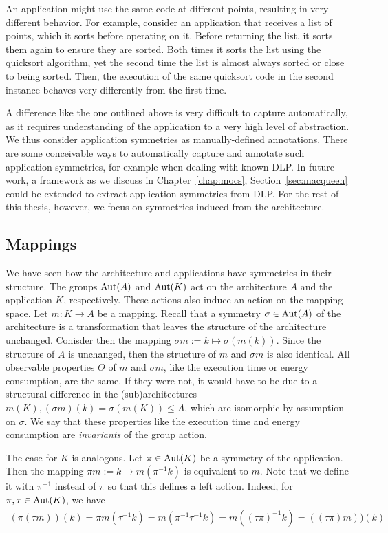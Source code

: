 An application might use the same code at different points, resulting in very different behavior.
For example, consider an application that receives a list of points, which it sorts before operating on it.
Before returning the list, it sorts them again to ensure they are sorted.
Both times it sorts the list using the quicksort algorithm, yet the second time the list is almost always sorted or close to being sorted.
Then, the execution of the same quicksort code in the second instance behaves very differently from the first time.

A difference like the one outlined above is very difficult to capture automatically, as it requires understanding of the application to a very high level of abstraction.
We thus consider application symmetries as manually-defined annotations.
There are some conceivable ways to automatically capture and annotate such application symmetries, for example when dealing with known \ac{DLP}.
In future work, a framework as we discuss in Chapter~\ref{chap:mocs}, Section~\ref{sec:macqueen} could be extended to extract application symmetries from \ac{DLP}.
For the rest of this thesis, however, we focus on symmetries induced from the architecture.

\subsection{Mappings}

We have seen how the architecture and applications have symmetries in their structure. 
The groups $\operatorname{Aut}(A)$ and $\operatorname{Aut}(K)$ act on the architecture $A$ and the application $K$, respectively.
These actions also induce an action on the mapping space. 
Let $m : K \rightarrow A$ be a mapping.
Recall that a symmetry $\sigma \in \operatorname{Aut}(A)$ of the architecture is a transformation that leaves the structure of the architecture unchanged.
Conisder then the mapping $\sigma m := k \mapsto \sigma(m(k))$.
Since the structure of $A$ is unchanged, then the structure of $m$ and $\sigma m$ is also identical.
All observable properties $\Theta$ of $m$ and $\sigma m$, like the execution time or energy consumption, are the same.
If they were not, it would have to be due to a structural difference in the (sub)architectures $m(K),(\sigma m)(k) = \sigma(m(K)) \leq A$, which are isomorphic by assumption on $\sigma$.
We say that these properties like the execution time and energy consumption are \emph{invariants} of the group action.

The case for $K$ is analogous.
Let $\pi \in \operatorname{Aut}(K)$ be a symmetry of the application.
Then the mapping $\pi m := k \mapsto m(\pi^{-1}k)$ is equivalent to $m$.
Note that we define it with $\pi^{-1}$ instead of $\pi$ so that this defines a left action.
Indeed, for $\pi, \tau \in \operatorname{Aut}(K)$, we have
\begin{align*}
  (\pi (\tau m))(k) = \pi m(\tau^{-1}k) = m(\pi^{-1}\tau^{-1}k) = m((\tau \pi)^{-1}k) = ((\tau \pi) m))(k) 
\end{align*}

